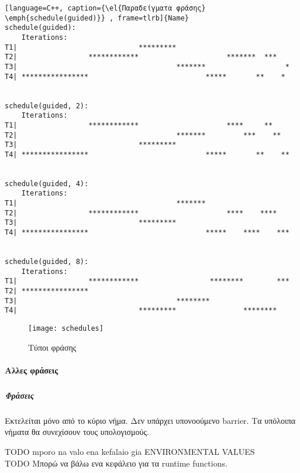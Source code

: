 \begin{lstlisting}[language=C++, caption={\el{Παραδείγματα φράσης} \emph{schedule(guided)}} , frame=tlrb]{Name}
schedule(guided):
    Iterations:       
T1|                             *********                       
T2|                 ************                     *******  ***   
T3|                                      *******                   *
T4| ****************                            *****       **    * 


schedule(guided, 2): 
    Iterations:
T1|                 ************                     ****     **    
T2|                                      *******         ***    **  
T3|                             *********                           
T4| ****************                            *****       **    **


schedule(guided, 4):   
    Iterations:
T1|                                      *******                    
T2|                 ************                     ****    ****   
T3|                             *********                           
T4| ****************                            *****    ****    ***


schedule(guided, 8):   
    Iterations:
T1|                 ************                 ********        ***
T2| ****************                                                
T3|                                      ********                   
T4|                             *********                ********
\end{lstlisting}
     
       
       \begin{figure}[h]
\texttt{[image: schedules]}
\centering
\captionsetup{justification=centering, singlelinecheck=false}
	\caption{Τύποι φράσης }
\label{fig:schedules}
\end{figure}


\paragraph{Αλλες φράσεις}
\subparagraph{}

\subparagraph{Φράσεις }
\subparagraph{}
      Εκτελείται μόνο από το κύριο νήμα. Δεν υπάρχει υπονοούμενο barrier. Τα υπόλοιπα νήματα θα συνεχίσουν τους υπολογισμούς.

{\Large TODO mporo na valo ena kefalaio gia ENVIRONMENTAL VALUES \\
TODO  Μπορώ να βάλω ενα κεφάλειο για τα runtime functions.}
